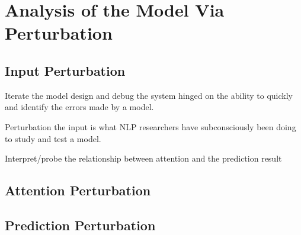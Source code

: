 \section{Analysis of the Model Via Perturbation}


\subsection{Input Perturbation}
Iterate the model design and debug the system hinged on the ability to quickly and identify the errors made by a model.

Perturbation the input is what NLP researchers have subconsciously been doing to study and test a model.

Interpret/probe the relationship between attention and the prediction result


\subsection{Attention Perturbation}


\subsection{Prediction Perturbation}

